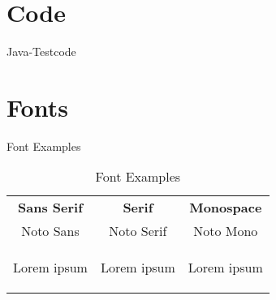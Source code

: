 \section{Code}
\label{sec:code}

\begin{frame}[fragile]{Java-Testcode}
	
\end{frame}

\section{Fonts}
\label{sec:fonts}

\begin{frame}{Font Examples}
	\begin{table}[h]
		\centering
		\begin{tabular}{ccc}
			\textbf{Sans Serif} & \textbf{Serif} & \textbf{Monospace}\\
			Noto Sans & Noto Serif & Noto Mono \\
			\hline
			Lorem ipsum &
			\begin{itshape}
				Lorem ipsum
			\end{itshape}
			&
			\begin{ttfamily}
				Lorem ipsum
			\end{ttfamily}\\
				\hline
		\end{tabular}

		\caption{Font Examples}
	\end{table}
\end{frame}
